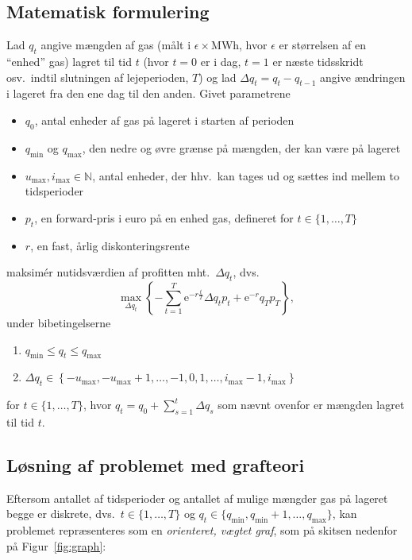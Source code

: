 \documentclass[12pt,oneside,final]{article}
\newcommand{\N}{\mathbb{N}}
\newcommand{\1}{\mathbbm{1}}
\newcommand{\e}{\mathrm{e}}
\begin{document}
\subsection{Matematisk formulering}
Lad \(q_{t}\) angive mængden af gas (målt i \(\epsilon\times\)MWh, hvor \(\epsilon\) er størrelsen af en ``enhed'' gas) lagret til tid \(t\) (hvor \(t = 0\) er i dag, \(t = 1\) er næste tidsskridt osv.\ indtil slutningen af lejeperioden, \(T\)) og lad \(\Delta q_{t} = q_{t} - q_{t-1}\) angive ændringen i lageret fra den ene dag til den anden.
Givet parametrene
\begin{itemize}
\item \(q_{0}\), antal enheder af gas på lageret i starten af perioden
\item \(q_{\min}\) og \(q_{\max}\), den nedre og øvre grænse på mængden, der kan være på lageret
\item \(u_{\max}, i_{\max} \in \N\), antal enheder, der hhv.\ kan tages ud og sættes ind mellem to tidsperioder
\item \(p_{t}\), en forward-pris i euro på en enhed gas, defineret for \(t \in \{1, \dotsc, T\}\)
\item \(r\), en fast, årlig diskonteringsrente
\end{itemize}
maksimér nutidsværdien af profitten mht.\ \(\Delta q_{t}\), dvs.\
\begin{equation}
  \label{eq:1}
  \max_{\Delta q_{t}}
  \left\{
    - \sum_{t = 1}^{T} \e^{-r\tfrac{t}{T}} \Delta q_{t} p_{t} + \e^{-r} q_{T} p_{T}
  \right\} ,
\end{equation}
under bibetingelserne
\begin{enumerate}
\item \(q_{\min} \leq q_{t} \leq q_{\max}\)
\item \(\Delta q_{t} \in
    \left\{
    -u_{\max}, -u_{\max}+1, \dotsc, -1, 0, 1, \dotsc, i_{\max} - 1, i_{\max}
    \right\}\)
\end{enumerate}
for \(t \in \{1, \dotsc, T\}\), hvor \(q_{t} = q_{0} + \sum_{s = 1}^{t} \Delta q_{s}\) som nævnt ovenfor er mængden lagret til tid \(t\).

\clearpage
\subsection{Løsning af problemet med grafteori}
Eftersom antallet af tidsperioder og antallet af mulige mængder gas på lageret begge er diskrete, dvs.\ \(t \in \{1, \dotsc, T\}\) og \(q_{t} \in \{q_{\min}, q_{\min}+1, \dotsc, q_{\max}\}\), kan problemet repræsenteres som en \emph{orienteret, vægtet graf}, som på skitsen nedenfor på Figur~\ref{fig:graph}:
\end{document}
